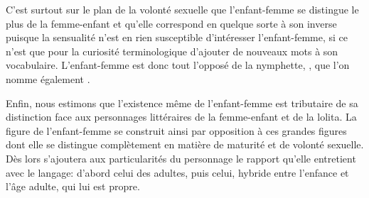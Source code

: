 \par
C'est surtout sur le plan de la volonté sexuelle que l'enfant-femme se distingue le plus de la femme-enfant et qu'elle correspond en quelque sorte à son inverse puisque la sensualité n'est en rien susceptible d'intéresser l'enfant-femme, si ce n'est que pour la curiosité terminologique d'ajouter de nouveaux mots à son vocabulaire.
L'enfant-femme est donc tout l'opposé de la nymphette, , que l'on nomme également .
\par
Enfin, nous estimons que l'existence même de l'enfant-femme est tributaire de sa distinction face aux personnages littéraires de la femme-enfant et de la lolita.
La figure de l'enfant-femme se construit ainsi par opposition à ces grandes figures dont elle se distingue complètement en matière de maturité et de volonté sexuelle.
Dès lors s'ajoutera aux particularités du personnage le rapport qu'elle entretient avec le langage: d'abord celui des adultes, puis celui, hybride entre l'enfance et l'âge adulte, qui lui est propre.
